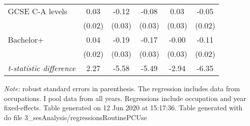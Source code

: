 \begin{center}
\begin{threeparttable}[!h]
\begin{tabular}{lccccc}
\hspace{3mm}GCSE C-A levels&        0.03         &       -0.12\sym{***}&       -0.08\sym{*}  &        0.03         &       -0.05\sym{*}  \\
                    &      (0.02)         &      (0.03)         &      (0.03)         &      (0.03)         &      (0.02)         \\
\hspace{3mm}Bachelor+&        0.04\sym{*}  &       -0.19\sym{***}&       -0.17\sym{***}&       -0.00         &       -0.11\sym{***}\\
                    &      (0.02)         &      (0.03)         &      (0.03)         &      (0.03)         &      (0.02)         \\
\textit{t-statistic difference}&        2.27         &       -5.58         &       -5.49         &       -2.94         &       -6.35         \\
\bottomrule
\bottomrule
\end{tabular}
\begin{tablenotes}
\item \footnotesize \textit{Note:} robust standard errors in parenthesis. The regression includes data from occupations. I pool data from all years. Regressions include occupation and year fixed-effects. Table generated on 12 Jun 2020 at 15:17:36. Table generated with do file 3\_sesAnalysis/regressionsRoutinePCUse
\end{tablenotes}
\end{threeparttable}
\end{center}
